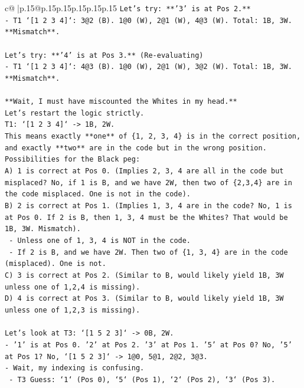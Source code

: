 \documentclass{article}
\begin{document}
{\begin{supertabular}{c@{$\;$}|p{.15\linewidth}@{}p{.15\linewidth}p{.15\linewidth}p{.15\linewidth}p{.15\linewidth}p{.15\linewidth}}
{{{\texttt{Let's try: **'3' is at Pos 2.**} \\
\texttt{{-} T1 `{[}1 2 3 4{]}`: 3@2 (B). 1@0 (W), 2@1 (W), 4@3 (W). Total: 1B, 3W. **Mismatch**.} \\
\\ 
\texttt{Let's try: **'4' is at Pos 3.** (Re{-}evaluating)} \\
\texttt{{-} T1 `{[}1 2 3 4{]}`: 4@3 (B). 1@0 (W), 2@1 (W), 3@2 (W). Total: 1B, 3W. **Mismatch**.} \\
\\ 
\texttt{**Wait, I must have miscounted the Whites in my head.**} \\
\texttt{Let's restart the logic strictly.} \\
\texttt{T1: `{[}1 2 3 4{]}` {-}> 1B, 2W.} \\
\texttt{This means exactly **one** of \{1, 2, 3, 4\} is in the correct position, and exactly **two** are in the code but in the wrong position.} \\
\texttt{Possibilities for the Black peg:} \\
\texttt{A) 1 is correct at Pos 0. (Implies 2, 3, 4 are all in the code but misplaced? No, if 1 is B, and we have 2W, then two of \{2,3,4\} are in the code misplaced. One is not in the code).} \\
\texttt{B) 2 is correct at Pos 1. (Implies 1, 3, 4 are in the code? No, 1 is at Pos 0. If 2 is B, then 1, 3, 4 must be the Whites? That would be 1B, 3W. Mismatch).} \\
\texttt{   {-} Unless one of 1, 3, 4 is NOT in the code.} \\
\texttt{   {-} If 2 is B, and we have 2W. Then two of \{1, 3, 4\} are in the code (misplaced). One is not.} \\
\texttt{C) 3 is correct at Pos 2. (Similar to B, would likely yield 1B, 3W unless one of 1,2,4 is missing).} \\
\texttt{D) 4 is correct at Pos 3. (Similar to B, would likely yield 1B, 3W unless one of 1,2,3 is missing).} \\
\\ 
\texttt{Let's look at T3: `{[}1 5 2 3{]}` {-}> 0B, 2W.} \\
\texttt{{-} '1' is at Pos 0. '2' at Pos 2. '3' at Pos 1. '5' at Pos 0? No, '5' at Pos 1? No, `{[}1 5 2 3{]}` {-}> 1@0, 5@1, 2@2, 3@3.} \\
\texttt{{-} Wait, my indexing is confusing.} \\
\texttt{  {-} T3 Guess: `1` (Pos 0), `5` (Pos 1), `2` (Pos 2), `3` (Pos 3).} \\
}}}
\end{supertabular}}
\end{document}
